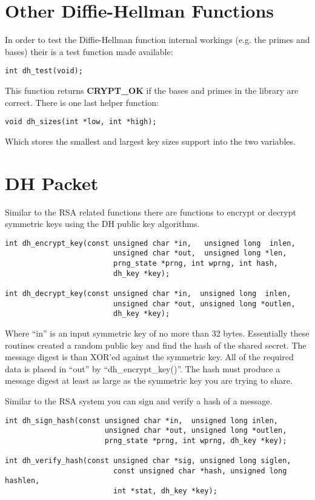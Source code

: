 \documentclass[a4paper]{book}
\begin{document}
\section{Other Diffie-Hellman Functions}
In order to test the Diffie-Hellman function internal workings (e.g. the primes and bases) their is a test function made
available:
\begin{verbatim}
int dh_test(void);
\end{verbatim}

This function returns {\bf CRYPT\_OK} if the bases and primes in the library are correct.  There is one last helper 
function:
\begin{verbatim}
void dh_sizes(int *low, int *high);
\end{verbatim}
Which stores the smallest and largest key sizes support into the two variables.

\section{DH Packet}
Similar to the RSA related functions there are functions to encrypt or decrypt symmetric keys using the DH public key
algorithms.  
 
\begin{verbatim}
int dh_encrypt_key(const unsigned char *in,   unsigned long  inlen,
                         unsigned char *out,  unsigned long *len, 
                         prng_state *prng, int wprng, int hash, 
                         dh_key *key);

int dh_decrypt_key(const unsigned char *in,  unsigned long  inlen,
                         unsigned char *out, unsigned long *outlen, 
                         dh_key *key);
\end{verbatim}
Where ``in'' is an input symmetric key of no more than 32 bytes.  Essentially these routines created a random public key
and find the hash of the shared secret.  The message digest is than XOR'ed against the symmetric key.  All of the 
required data is placed in ``out'' by ``dh\_encrypt\_key()''.   The hash must produce a message digest at least as large
as the symmetric key you are trying to share.

Similar to the RSA system you can sign and verify a hash of a message.
 
\begin{verbatim}
int dh_sign_hash(const unsigned char *in,  unsigned long inlen,
                       unsigned char *out, unsigned long *outlen,
                       prng_state *prng, int wprng, dh_key *key);

int dh_verify_hash(const unsigned char *sig, unsigned long siglen,
                         const unsigned char *hash, unsigned long hashlen, 
                         int *stat, dh_key *key);
\end{verbatim}
\end{document}
